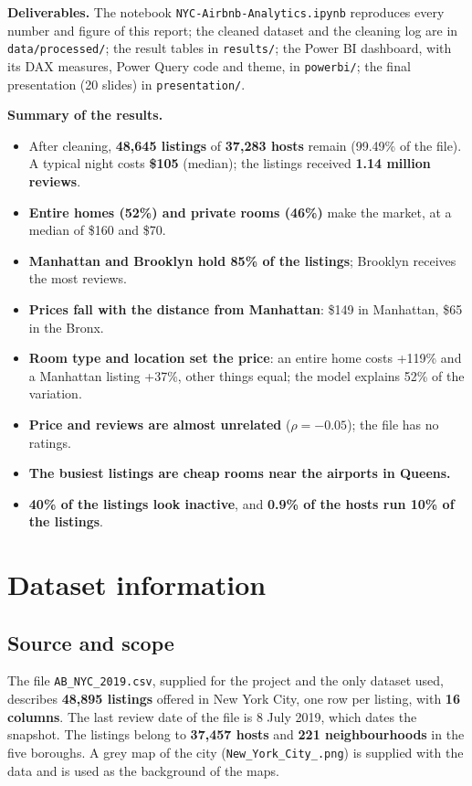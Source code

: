 \documentclass[12pt,a4paper]{article}
\begin{document}
\textbf{Deliverables.} The notebook \texttt{NYC-Airbnb-Analytics.ipynb} reproduces every number and
figure of this report; the cleaned dataset and the cleaning log are in \texttt{data/processed/};
the result tables in \texttt{results/}; the Power BI dashboard, with its DAX measures, Power Query
code and theme, in \texttt{powerbi/}; the final presentation (20 slides) in \texttt{presentation/}.

\textbf{Summary of the results.}
\begin{itemize}
\item After cleaning, \textbf{48{,}645 listings} of \textbf{37{,}283 hosts} remain (99.49\% of the file).
A typical night costs \textbf{\$105} (median); the listings received \textbf{1.14 million reviews}.
\item \textbf{Entire homes (52\%) and private rooms (46\%)} make the market, at a median of \$160 and \$70.
\item \textbf{Manhattan and Brooklyn hold 85\% of the listings}; Brooklyn receives the most reviews.
\item \textbf{Prices fall with the distance from Manhattan}: \$149 in Manhattan, \$65 in the Bronx.
\item \textbf{Room type and location set the price}: an entire home costs +119\% and a Manhattan
listing +37\%, other things equal; the model explains 52\% of the variation.
\item \textbf{Price and reviews are almost unrelated} ($\rho = -0.05$); the file has no ratings.
\item \textbf{The busiest listings are cheap rooms near the airports in Queens.}
\item \textbf{40\% of the listings look inactive}, and \textbf{0.9\% of the hosts run 10\% of the listings}.
\end{itemize}

\section{Dataset information}

\subsection{Source and scope}

The file \texttt{AB\_NYC\_2019.csv}, supplied for the project and the only dataset used, describes \textbf{48{,}895 listings} offered in New York City, one row per listing,
with \textbf{16 columns}. The last review date of the file is 8 July 2019, which dates the snapshot.
The listings belong to \textbf{37{,}457 hosts} and \textbf{221 neighbourhoods} in the five boroughs.
A grey map of the city (\texttt{New\_York\_City\_.png}) is supplied with the data and is used as
the background of the maps.
\end{document}
